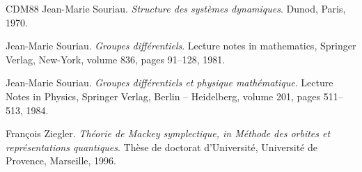 \documentclass[10pt,reqno,twoside]{amsart}
\theoremstyle{plain}
\theoremstyle{definition}
\begin{document}
\begin{thebibliography}{CDM88}
    Jean-Marie Souriau.
    \newblock \emph{Structure des syst\`emes dynamiques}.
    \newblock Dunod, Paris, 1970.
    
    Jean-Marie Souriau.
    \newblock \emph{Groupes diff\'erentiels}.
    \newblock Lecture notes in mathematics, Springer Verlag, New-York, volume 836, pages 91--128, 1981.
    
    Jean-Marie Souriau.
    \newblock \emph{Groupes diff\'erentiels et physique math\'ematique}.
    \newblock Lecture Notes in Physics, Springer Verlag, Berlin -- Heidelberg, volume 201, pages 511--513, 1984.
    
    Fran\c cois Ziegler.
    \newblock \emph{Th\'eorie de Mackey symplectique, in M\'ethode des or\-bi\-tes et repr\'esentations quantiques}.
    \newblock Th\`ese de doctorat d'Uni\-ver\-sit\'e, Universit\'e de Provence, Marseille, 1996.
    
  \end{thebibliography}
  
\end{document}
